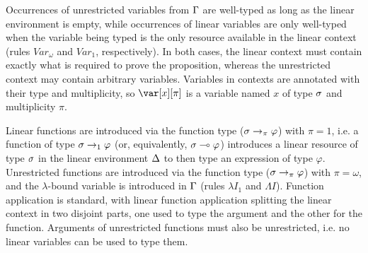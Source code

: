 \documentclass[acmsmall,review,anonymous]{acmart}
\newcommand{\lolli}{\multimap}
\begin{document}
Occurrences of unrestricted variables from $\Gamma$ are well-typed as long as the linear
environment is empty, while occurrences of linear variables are only well-typed
when the variable being typed is the only resource available in the
linear context (rules $Var_\omega$ and $Var_1$, respectively).
In both cases, the linear context must contain exactly what is required to
prove the proposition, whereas the unrestricted context may contain arbitrary
variables.
%
Variables in contexts are annotated with their type and multiplicity, so
$\x[\pi]$ is a variable named $x$ of type $\sigma$ and multiplicity $\pi$.

Linear functions are introduced via the function type ($\sigma \to_\pi \varphi$) with
$\pi = 1$, i.e. a function of type $\sigma \to_1 \varphi$ (or, equivalently, $\s \lolli \vp$)
introduces a linear resource of type $\sigma$ in the linear environment $\Delta$ to then type an expression of type $\varphi$.
%
Unrestricted functions are introduced via the function type ($\sigma \to_\pi \varphi$) with $\pi =
\omega$, and the $\lambda$-bound variable is introduced in $\Gamma$ (rules
$\lambda I_1$ and $\Lambda I$). Function application is standard, with
linear function application splitting the linear context in two
disjoint parts, one used to type the argument and the other for the
function.
Arguments of unrestricted functions must also be unrestricted, i.e. no
linear variables can be used to type them. 
\end{document}
